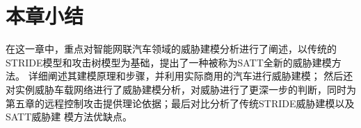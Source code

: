 \section{本章小结}
在这一章中，重点对智能网联汽车领域的威胁建模分析进行了阐述，以传统的STRIDE模型和攻击树模型为基础，提出了一种被称为SATT全新的威胁建模方法。
详细阐述其建模原理和步骤，并利用实际商用的汽车进行威胁建模；
然后还对实例威胁车载网络进行了威胁建模分析，对威胁进行了更深一步的判断，同时为第五章的远程控制攻击提供理论依据；最后对比分析了传统STRIDE威胁建模以及SATT威胁建
模方法优缺点。
